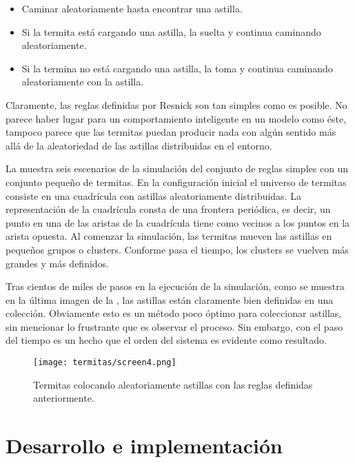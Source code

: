 \begin{itemize}
  \item Caminar aleatoriamente hasta encontrar una astilla.
  \item Si la termita está cargando una astilla, la suelta y continua caminando aleatoriamente.
  \item Si la termina no está cargando una astilla, la toma y continua caminando aleatoriamente con la astilla.
\end{itemize}

Claramente, las reglas definidas por Resnick son tan simples como es posible. No parece haber lugar para un comportamiento inteligente en un modelo como éste, tampoco parece que las termitas puedan producir nada con algún sentido más allá de la aleatoriedad de las astillas distribuidas en el entorno.\par

La  muestra seis escenarios de la simulación del conjunto de reglas simples con un conjunto pequeño de termitas. En la configuración inicial el universo de termitas consiste en una cuadrícula con astillas aleatoriamente distribuidas. La representación de la cuadrícula consta de una frontera periódica, es decir, un punto en una de las aristas de la cuadrícula tiene como vecinos a los puntos en la arista opuesta.
Al comenzar la simulación, las termitas mueven las astillas en pequeños grupos o clusters. Conforme pasa el tiempo, los clusters se vuelven más grandes y más definidos.\par

Tras cientos de miles de pasos en la ejecución de la simulación, como se muestra en la última imagen de la , las astillas están claramente bien definidas en una colección. Obviamente esto es un método poco óptimo para coleccionar astillas, sin mencionar lo frustrante que es observar el proceso. Sin embargo, con el paso del tiempo es un hecho que el orden del sistema es evidente como resultado.\par

\begin{figure}
  \centering
  \texttt{[image: termitas/screen4.png]}
  \caption{Termitas colocando aleatoriamente astillas con las reglas definidas anteriormente.}
  \label{fig:termitasaleatorias}
\end{figure}


\section{Desarrollo e implementaci\'on}

